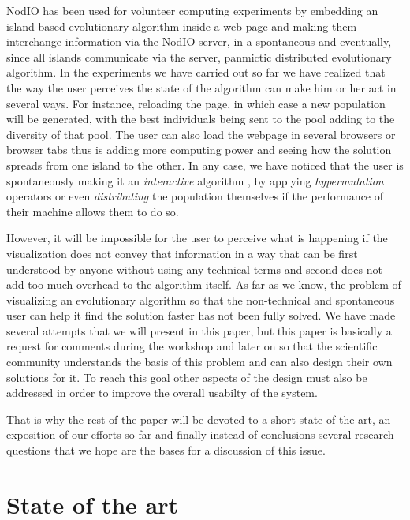 \documentclass{sig-alternate}
\begin{document}
NodIO has been used for volunteer computing experiments by
embedding an island-based evolutionary algorithm inside a web page and
making them interchange information via the NodIO server, in a
spontaneous and eventually, since all islands communicate via the
server, panmictic distributed evolutionary
algorithm. In the experiments we have carried out so far we have
realized that the way the user perceives the state of the algorithm
can make him or her act in several ways. For instance, reloading the
page, in which case a new population will be generated, with the best
individuals being sent to the pool adding to the diversity of that
pool. The user can also load the webpage in several browsers or
browser tabs thus is adding more computing power and seeing how the 
solution spreads from one island to the other. In any case, we have noticed
that the user is spontaneously making it an {\em interactive}
algorithm \cite{takagi01interactive}, by applying {\em hypermutation} 
operators or even {\em distributing} the population themselves if the 
performance of their machine allows them to do so. 

However, it will be impossible for the user to perceive what is
happening if the visualization does not convey that information in a
way that can be first understood by anyone without using any technical
terms and second does not add too much overhead to the algorithm
itself. As far as we know, the problem of visualizing an evolutionary
algorithm so that the non-technical and spontaneous user can help it
find the solution faster has not been fully solved. We have made several
attempts that we will present in this paper, but this paper is
basically a request for comments during the workshop and later on so
that the scientific community understands the basis of this problem
and can also design their own solutions for it. To reach this goal
other aspects of the design must also be  addressed in order to
improve the overall usabilty of the system.

That is why the rest of the paper will be devoted to a short state of
the art, an exposition of our efforts so far and finally instead of
conclusions several research questions that we hope are the bases for
a discussion of this issue.



\section{State of the art}
\label{sec:soa}
\end{document}
